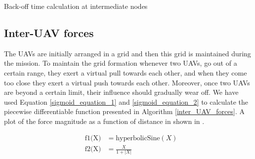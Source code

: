\begin{algorithm}
\caption{Back-off time calculation at intermediate nodes}
\label{back_off_time_algo}
\DontPrintSemicolon
{}


\end{algorithm} 

\subsection{Inter-UAV forces}
The UAVs are initially arranged in a grid and then this grid is maintained during the mission. To maintain the grid formation whenever two UAVs, go out of a certain range, they exert a virtual pull towards each other, and when they come too close they exert a virtual push towards each other. Moreover, once two UAVs are beyond a certain limit, their influence should gradually wear off. We have used Equation \ref{sigmoid_equation_1} and \ref{sigmoid_equation_2} to calculate the piecewise differentiable function presented in Algorithm \ref{inter_UAV_forces}. A plot of the force magnitude as a function of distance in shown in .

\begin{eqnarray}
\label{sigmoid_equation_1}
    & \text{f1(X)} & = \text{hyperbolicSine}(X)\\
\label{sigmoid_equation_2}
    & \text{f2(X)} & = \frac{X}{1 + |X|}
\end{eqnarray}

